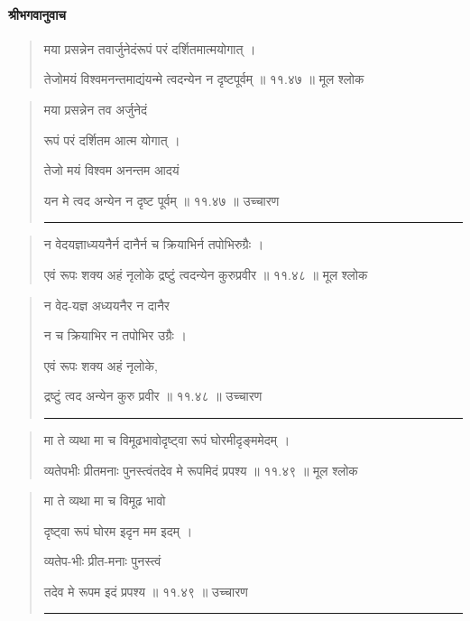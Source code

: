 \paragraph{\sanskrit श्रीभगवानुवाच}
\begin{quotation} 
मया प्रसन्नेन तवार्जुनेदंरूपं परं दर्शितमात्मयोगात्‌  ।  

तेजोमयं विश्वमनन्तमाद्यंयन्मे त्वदन्येन न दृष्टपूर्वम्‌  ॥ ११.४७ ॥  मूल श्लोक
\end{quotation}

\begin{quotation}

मया प्रसन्नेन तव अर्जुनेदं 

रूपं परं दर्शितम आत्म योगात्‌  ।  

तेजो मयं विश्वम अनन्तम आदयं 

यन मे त्वद अन्येन न दृष्ट पूर्वम्‌  ॥ ११.४७ ॥  उच्चारण

\noindent\rule{16cm}{0.4pt} 
\end{quotation}


\begin{quotation} 

न वेदयज्ञाध्ययनैर्न दानैर्न च क्रियाभिर्न तपोभिरुग्रैः  ।  

एवं रूपः शक्य अहं नृलोके द्रष्टुं त्वदन्येन कुरुप्रवीर  ॥ ११.४८ ॥  मूल श्लोक
\end{quotation}

\begin{quotation}
न वेद-यज्ञ अध्ययनैर न दानैर 

न च क्रियाभिर न तपोभिर उग्रैः  ।  

एवं रूपः शक्य अहं नृलोके,

द्रष्टुं त्वद अन्येन कुरु प्रवीर  ॥ ११.४८ ॥  उच्चारण

\noindent\rule{16cm}{0.4pt} 
\end{quotation}


\begin{quotation} 

मा ते व्यथा मा च विमूढभावोदृष्ट्वा रूपं घोरमीदृङ्‍ममेदम्‌  ।  

व्यतेपभीः प्रीतमनाः पुनस्त्वंतदेव मे रूपमिदं प्रपश्य  ॥ ११.४९ ॥  मूल श्लोक
\end{quotation}

\begin{quotation}

मा ते व्यथा मा च विमूढ भावो 

दृष्ट्वा रूपं घोरम इदृन मम इदम्‌  ।  

व्यतेप-भीः प्रीत-मनाः पुनस्त्वं

तदेव मे रूपम इदं प्रपश्य  ॥ ११.४९ ॥  उच्चारण

\noindent\rule{16cm}{0.4pt} 
\end{quotation}


